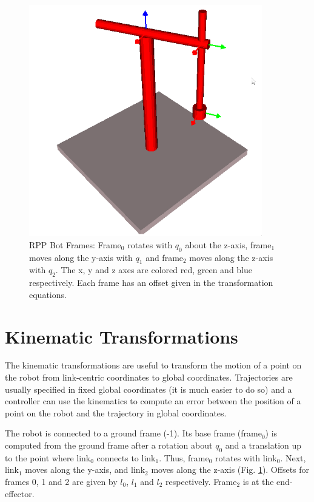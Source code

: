 \documentclass[12pt]{article}
\begin{document}
\begin{figure}[ht!]
\begin{center}
\includegraphics[width=4in]{figs/rpp-bot-frames.png}
\caption{RPP Bot Frames: Frame$_0$ rotates with $q_0$ about the z-axis, frame$_1$ moves along the y-axis 
with $q_1$ and frame$_2$ moves along the z-axis with $q_2$. The x, y and z axes are colored red, green 
and blue respectively. Each frame has an offset given in the transformation equations.}
\label{fig:rppframes}
\end{center}
\end{figure}

\section{Kinematic Transformations}
The kinematic transformations are useful to transform the motion of a point on the robot
from link-centric coordinates to global coordinates. Trajectories are usually specified in
fixed global coordinates (it is much easier to do so) and a controller can use the kinematics to
compute an error between the position of a point on the robot and the trajectory in global
coordinates.

The robot is connected to a ground frame (-1). Its base frame (frame$_0$) is computed
from the ground frame after a rotation about $q_0$ and a translation up to the
point where link$_0$ connects to link$_1$. Thus, frame$_0$ rotates with link$_0$.
Next, link$_1$ moves along the y-axis, and link$_2$ moves along the z-axis (Fig. \ref{fig:rppframes}).
Offsets for frames 0, 1 and 2 are given by $l_0$, $l_1$ and $l_2$ respectively. 
Frame$_2$ is at the end-effector.
\end{document}
